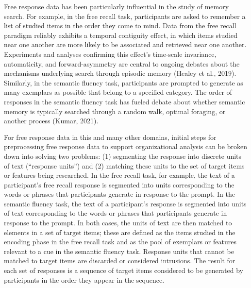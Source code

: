 \documentclass[
  letterpaper,
  DIV=11,
  numbers=noendperiod]{scrreprt}
\begin{document}
Free response data has been particularly influential in the study of
memory search. For example, in the free recall task, participants are
asked to remember a list of studied items in the order they come to
mind. Data from the free recall paradigm reliably exhibits a temporal
contiguity effect, in which items studied near one another are more
likely to be associated and retrieved near one another. Experiments and
analyses confirming this effect's time-scale invariance, automaticity,
and forward-asymmetry are central to ongoing debates about the
mechanisms underlying search through episodic memory (Healey et al.,
2019). Similarly, in the semantic fluency task, participants are
prompted to generate as many exemplars as possible that belong to a
specified category. The order of responses in the semantic fluency task
has fueled debate about whether semantic memory is typically searched
through a random walk, optimal foraging, or another process (Kumar,
2021).

For free response data in this and many other domains, initial steps for
preprocessing free response data to support organizational analysis can
be broken down into solving two problems: (1) segmenting the response
into discrete units of text (``response units'') and (2) matching these
units to the set of target items or features being researched. In the
free recall task, for example, the text of a participant's free recall
response is segmented into units corresponding to the words or phrases
that participants generate in response to the prompt. In the semantic
fluency task, the text of a participant's response is segmented into
units of text corresponding to the words or phrases that participants
generate in response to the prompt. In both cases, the units of text are
then matched to elements in a set of target items; these are defined as
the items studied in the encoding phase in the free recall task and as
the pool of exemplars or features relevant to a cue in the semantic
fluency task. Response units that cannot be matched to target items are
discarded or considered intrusions. The result for each set of responses
is a sequence of target items considered to be generated by participants
in the order they appear in the sequence.
\end{document}
